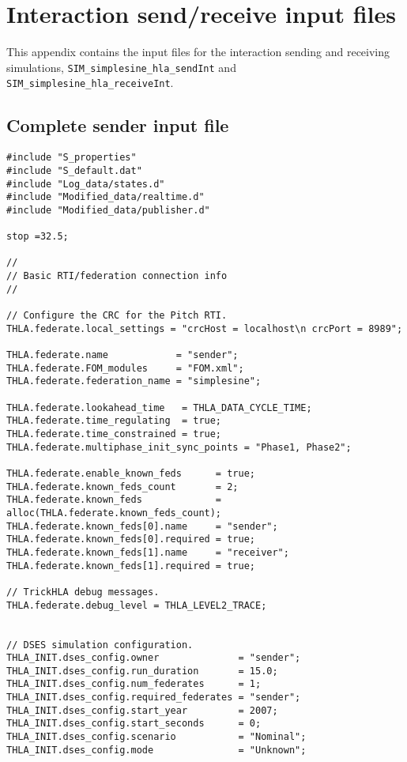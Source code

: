 \chapter{Interaction send/receive input files}\label{sec:send-receive-inputs}

This appendix contains the input files for the interaction
sending and receiving simulations,
{\tt SIM\_\-simple\-sine\_\-hla\_sendInt} and
{\tt SIM\_simplesine\_hla\_receiveInt}.

\section{Complete sender input file}\label{sec:complete-sender-input}

\begin{lstlisting}[caption={{\tt SIM\_simplesine\_hla\_sendInt} input file},label={list:complete-sender-input}]
#include "S_properties"
#include "S_default.dat"
#include "Log_data/states.d"
#include "Modified_data/realtime.d"
#include "Modified_data/publisher.d"

stop =32.5; 

//
// Basic RTI/federation connection info
//

// Configure the CRC for the Pitch RTI.
THLA.federate.local_settings = "crcHost = localhost\n crcPort = 8989";

THLA.federate.name            = "sender"; 
THLA.federate.FOM_modules     = "FOM.xml"; 
THLA.federate.federation_name = "simplesine"; 

THLA.federate.lookahead_time   = THLA_DATA_CYCLE_TIME;
THLA.federate.time_regulating  = true; 
THLA.federate.time_constrained = true; 
THLA.federate.multiphase_init_sync_points = "Phase1, Phase2";

THLA.federate.enable_known_feds      = true; 
THLA.federate.known_feds_count       = 2; 
THLA.federate.known_feds             = alloc(THLA.federate.known_feds_count); 
THLA.federate.known_feds[0].name     = "sender"; 
THLA.federate.known_feds[0].required = true; 
THLA.federate.known_feds[1].name     = "receiver"; 
THLA.federate.known_feds[1].required = true; 

// TrickHLA debug messages.
THLA.federate.debug_level = THLA_LEVEL2_TRACE;


// DSES simulation configuration.
THLA_INIT.dses_config.owner              = "sender";
THLA_INIT.dses_config.run_duration       = 15.0;
THLA_INIT.dses_config.num_federates      = 1;
THLA_INIT.dses_config.required_federates = "sender";
THLA_INIT.dses_config.start_year         = 2007;
THLA_INIT.dses_config.start_seconds      = 0;
THLA_INIT.dses_config.scenario           = "Nominal";
THLA_INIT.dses_config.mode               = "Unknown";


\end{lstlisting}
